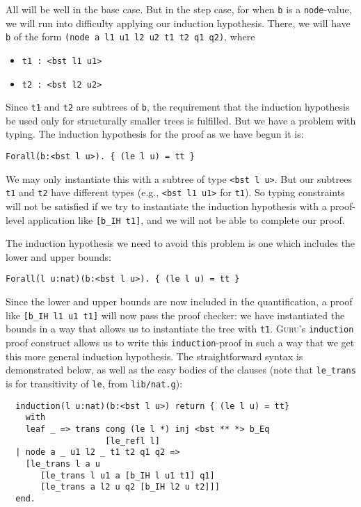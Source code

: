 \documentclass{book}[12pt]
\newcommand{\guru}[0]{\textsc{Guru}\xspace}
\begin{document}
\noindent All will be well in the base case.  But in the step case,
for when \texttt{b} is a \texttt{node}-value, we will run into difficulty
applying our induction hypothesis.  There, we will have \texttt{b} of
the form \texttt{(node a l1 u1 l2 u2 t1 t2 q1 q2)}, where

\begin{itemize}
\item \texttt{t1 : <bst l1 u1>}
\item \texttt{t2 : <bst l2 u2>}
\end{itemize}

\noindent Since \texttt{t1} and \texttt{t2} are subtrees of \texttt{b}, the requirement
that the induction hypothesis be used only for structurally smaller trees is fulfilled.
But we have a problem with typing.  The induction hypothesis for the proof as we have
begun it is:

\begin{verbatim}
Forall(b:<bst l u>). { (le l u) = tt }
\end{verbatim}

\noindent We may only instantiate this with a subtree of type
\texttt{<bst l u>}.  But our subtrees \texttt{t1} and \texttt{t2} have
different types (e.g., \texttt{<bst l1 u1>} for \texttt{t1}).  So typing
constraints will not be satisfied if we try to instantiate the induction
hypothesis with a proof-level application like \texttt{[b\_IH t1]}, and
we will not be able to complete our proof.

The induction hypothesis we need to avoid this problem is one which includes
the lower and upper bounds:

\begin{verbatim}
Forall(l u:nat)(b:<bst l u>). { (le l u) = tt }
\end{verbatim}

\noindent Since the lower and upper bounds are now included in the
quantification, a proof like \texttt{[b\_IH l1 u1 t1]} will now pass
the proof checker: we have instantiated the bounds in a way that
allows us to instantiate the tree with \texttt{t1}.  \guru's
\texttt{induction} proof construct allows us to write this
\texttt{induction}-proof in such a way that we get this more general
induction hypothesis.  The straightforward syntax is demonstrated
below, as well as the easy bodies of the clauses (note that
\texttt{le\_trans} is for transitivity of \texttt{le}, from
\texttt{lib/nat.g}):

\begin{verbatim}
  induction(l u:nat)(b:<bst l u>) return { (le l u) = tt}
    with
    leaf _ => trans cong (le l *) inj <bst ** *> b_Eq
                    [le_refl l] 
  | node a _ u1 l2 _ t1 t2 q1 q2 => 
    [le_trans l a u
       [le_trans l u1 a [b_IH l u1 t1] q1]
       [le_trans a l2 u q2 [b_IH l2 u t2]]]
  end.
\end{verbatim}
\end{document}
